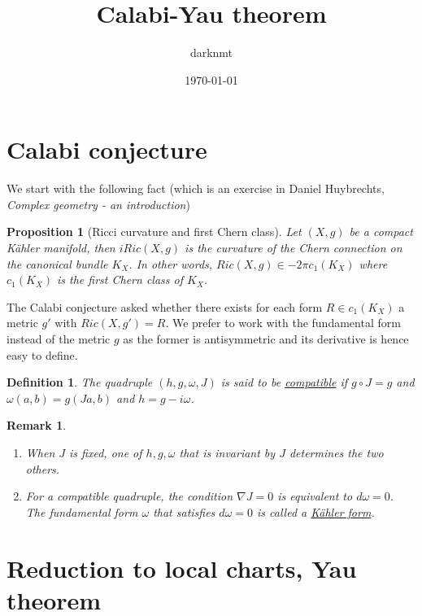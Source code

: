 \documentclass[11pt]{article}
\author{darknmt}
\date{\today}
\title{Calabi-Yau theorem}
\newtheorem{remark}{Remark}
\newtheorem{proposition}{Proposition}[theorem]
\newtheorem{definition}{Definition}
\begin{document}
\maketitle
\tableofcontents


\section{Calabi conjecture}
\label{sec:orga8314a6}
We start with the following fact (which is an exercise in Daniel Huybrechts, \emph{Complex geometry - an introduction})

\begin{proposition}[Ricci curvature and first Chern class]
Let \((X,g)\) be a compact Kähler manifold, then \(iRic(X,g)\) is the curvature of the Chern connection
on the canonical bundle \(K_X\). In other words, \(Ric(X,g)\in -2\pi c_1(K_X)\) where
\(c_1(K_X)\) is the first Chern class of \(K_X\).
\end{proposition}

The Calabi conjecture asked whether there exists for each form \(R\in c_1(K_X)\) a metric \(g'\) with
\(Ric(X,g') = R\). We prefer to work with the fundamental form instead of the metric \(g\) as the former
is antisymmetric and its derivative is hence easy to define.

\begin{definition}
The quadruple \((h, g, \omega, J)\) is said to be \uline{compatible} if \(g\circ J = g\) and \(\omega(a,b) =
g(Ja,b)\) and \(h = g - i\omega\). 
\end{definition}

\begin{remark}
\begin{enumerate}
\item When \(J\) is fixed, one of \(h,g,\omega\) that is invariant by \(J\) determines the two others.
\item For a compatible quadruple, the condition \(\nabla J = 0\) is equivalent to \(d\omega = 0\). The
fundamental form \(\omega\) that satisfies \(d\omega = 0\) is called a \uline{Kähler form}.
\end{enumerate}
\end{remark}


\section{Reduction to local charts, Yau theorem}
\label{sec:orge47df6e}
\end{document}

